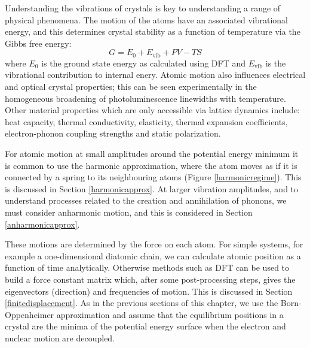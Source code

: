 Understanding the vibrations of crystals is key to understanding a range of physical phenomena. The motion of the atoms have an associated vibrational energy, and this determines crystal stability as a function of temperature via the Gibbs free energy:
\begin{equation}
G = E_0+E_\textrm{vib}+PV-TS
\end{equation}
where $E_0$ is the ground state energy as calculated using DFT and $E_\textrm{vib}$ is the vibrational contribution to internal enery.
Atomic motion also influences electrical and optical crystal properties; this can be seen experimentally in the homogeneous broadening of photoluminescence linewidths with temperature.%
Other material properties which are only accessible via lattice dynamics include: heat capacity, thermal conductivity, elasticity, thermal expansion coefficients, electron-phonon coupling strengths and static polarization.

For atomic motion at small amplitudes around the potential energy minimum it is common to use the harmonic approximation, where the atom moves as if it is connected by a spring to its neighbouring atoms (Figure \ref{harmonicregime}). This is discussed in Section \ref{harmonicapprox}. At larger vibration amplitudes, and to understand processes related to the creation and annihilation of phonons, we must consider anharmonic motion, and this is considered in Section \ref{anharmonicapprox}.

These motions are determined by the force on each atom. For simple systems, for example a one-dimensional diatomic chain, we can calculate atomic position as a function of time analytically. Otherwise methods such as DFT can be used to build a force constant matrix which, after some post-processing steps, gives the eigenvectors (direction) and frequencies of motion. This is discussed in Section \ref{finitedisplacement}. As in the previous sections of this chapter, we use the Born-Oppenheimer approximation and assume that the equilibrium positions in a crystal are the minima of the potential energy surface when the electron and nuclear motion are decoupled.

